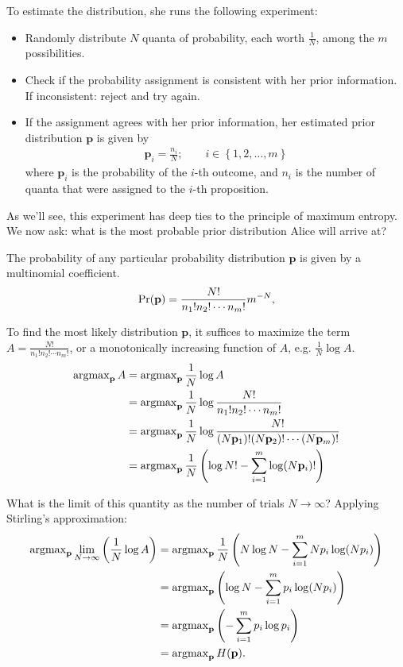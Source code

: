 \documentclass[13pt]{article}
\newcommand{\p}{\mathbf{p}}
\begin{document}
To estimate the distribution, she runs the following experiment:

\begin{itemize}
  \item Randomly distribute $N$ quanta of probability, each worth $\frac{1}{N}$, among the $m$ possibilities.
  \item Check if the probability assignment is consistent with her prior information.  If inconsistent: reject and try again.
  \item If the assignment agrees with her prior information, her estimated prior distribution $\p$ is given by
    \begin{align*}
      \p_i = \frac{n_i}{N}; \qquad i \in \left\{ 1, 2, \dots, m \right\}
    \end{align*}
    where $\p_i$ is the probability of the $i$-th outcome, and $n_i$ is the number of quanta that were assigned to the $i$-th proposition.
\end{itemize}

As we'll see, this experiment has deep ties to the principle of maximum entropy.  We now ask: what is the most probable prior distribution Alice will arrive at?

The probability of any particular probability distribution $\p$ is given by a multinomial coefficient.
\begin{align*}
  \Pr(\mathbf{p}) = \frac{N!}{n_1! n_2 ! \cdots n_m!} m^{-N},
\end{align*}

To find the most likely distribution $\p$, it suffices to maximize the term $A = \frac{N!}{n_1! n_2! \cdots n_m!}$, or a monotonically increasing function of $A$, e.g. $\frac{1}{N} \log A$.
\begin{align*}
  \argmax_{\mbf{p}} A  &= \argmax_{\mbf{p}} \frac{1}{N} \log A \\
  &= \argmax_{\mbf{p}} \frac{1}{N} \log \frac{N!}{n_1! n_2! \cdots n_m!} \\
  &= \argmax_{\mbf{p}} \frac{1}{N} \log \frac{N!}{(N \p_1)! (N \p_2)! \cdots (N \p_m)!} \\
  &= \argmax_{\mbf{p}} \frac{1}{N} \left( \log N! - \sum_{i=1}^{m} \log (N \p_i)! \right)
\end{align*}

What is the limit of this quantity as the number of trials $N \to \infty$?  Applying Stirling's approximation:
\begin{align*}
  \argmax_{\p} \lim_{N \to \infty} \left ( \frac{1}{N} \log A \right ) &= \argmax_{\p} \frac{1}{N} \left( N \log N - \sum_{i=1}^{m} N p_i \log (N p_i) \right) \\
  &= \argmax_{\p} \left ( \log N - \sum_{i=1}^{m} {p_i} \log (N p_i) \right ) \\
  & = \argmax_{\p} \left ( - \sum_{i=1}^{m} p_i \log p_i \right ) \\
  & = \argmax_{\p} H(\mbf{p}).
\end{align*}
\end{document}
